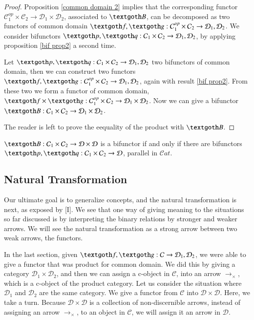 \documentclass [12pt]{book}
\begin{document}
\begin{proof}Proposition \ref{common domain 2} implies that the corresponding functor $\mathcal C_1^{op}\times\mathcal C_2\rightarrow\mathcal D_1\times\mathcal D_2$, associated to $\textgoth B$, can be decomposed as two functors of common domain $\textgoth f,\textgoth g:\mathcal C_1^{op}\times\mathcal C_2\rightarrow\mathcal D_1,\mathcal D_2$. We consider bifunctors $\textgoth p,\textgoth q:\mathcal C_1\times\mathcal C_2\rightarrow\mathcal D_1,\mathcal D_2$, by applying proposition \ref{bif prop2} a second time.

Let $\textgoth p,\textgoth q:\mathcal C_1\times\mathcal C_2\rightarrow\mathcal D_1,\mathcal D_2$ two bifunctors of common domain, then we can construct two functors $\textgoth f,\textgoth g:\mathcal C_1^{op}\times\mathcal C_2\rightarrow\mathcal D_1,\mathcal D_2$, again with result \ref{bif prop2}. From these two we form a functor of common domain, $\textgoth f\times\textgoth g:\mathcal C_1^{op}\times\mathcal C_2\rightarrow\mathcal D_1\times\mathcal D_2$. Now we can give a bifunctor $\textgoth B:\mathcal C_1\times\mathcal C_2\rightarrow\mathcal D_1\times\mathcal D_2$.

The reader is left to prove the eequality of the product with $\textgoth B$.\end{proof}

\begin{corollary}$\textgoth B:\mathcal C_1\times\mathcal C_2\rightarrow\mathcal D\times\mathcal D$ is a bifunctor if and only if there are bifunctors $\textgoth p,\textgoth q:\mathcal C_1\times\mathcal C_2\rightarrow\mathcal D$, parallel in $\mathcal Cat$.\end{corollary}


		\subsection{Natural Transformation}

Our ultimate goal is to generalize concepts, and the natural transformation is next, as exposed by [I]. We see that one way of giving meaning to the situations so far discussed is by interpreting the binary relations by stronger and weaker arrows. We will see the natural transformation as a strong arrow between two weak arrows, the functors. 

In the last section, given $\textgoth f,\textgoth g:\mathcal C\rightarrow\mathcal D_1,\mathcal D_2$, we were able to give a functor that was product for common domain. We did this by giving a category $\mathcal D_1\times\mathcal D_2$, and then we can assign a c-object in $\mathcal C$, into an arrow $\rightarrow_\times$, which is a c-object of the product category. Let us consider the situation where $\mathcal D_1$ and $\mathcal D_2$ are the same category. We give a functor from $\mathcal C$ into $\mathcal D\times\mathcal D$. Here, we take a turn. Because $\mathcal D\times\mathcal D$ is a collection of non-discernible arrows, instead of assigning an arrow $\rightarrow_\times$, to an object in $\mathcal C$, we will assign it an arrow in $\mathcal D$.
\end{document}
